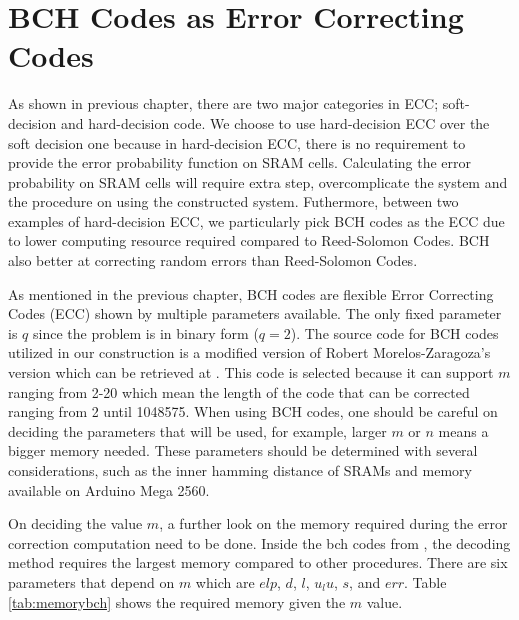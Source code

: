 \section{BCH Codes as Error Correcting Codes}\label{ch:bch}
As shown in previous chapter, there are two major categories in ECC; soft-decision and hard-decision code. We choose to use hard-decision ECC over the soft decision one because in hard-decision ECC, there is no requirement to provide the error probability function on SRAM cells. Calculating the error probability on SRAM cells will require extra step, overcomplicate the system and the procedure on using the constructed system. 
Futhermore, between two examples of hard-decision ECC, we particularly pick BCH codes as the ECC due to lower computing resource required compared to Reed-Solomon Codes. BCH also better at correcting random errors than Reed-Solomon Codes.

As mentioned in the previous chapter, BCH codes are flexible Error Correcting Codes (ECC) shown by multiple parameters available. The only fixed parameter is $q$ since the problem is in binary form ($q=2$). The source code for BCH codes utilized in our construction is a modified version of Robert Morelos-Zaragoza's version which can be retrieved at \cite{bch_code}. This code is selected because it can support $m$ ranging from 2-20 which mean the length of the code that can be corrected ranging from 2 until 1048575. When using BCH codes, one should be careful on deciding the parameters that will be used, for example, larger $m$ or $n$ means a bigger memory needed.
These parameters should be determined with several considerations, such as the inner hamming distance of SRAMs and memory available on Arduino Mega 2560.

On deciding the value $m$, a further look on the memory required during the error correction computation need to be done. Inside the bch codes from \cite{bch_code}, the decoding method requires the largest memory compared to other procedures. There are six parameters that depend on $m$ which are $elp$, $d$, $l$, $u_lu$, $s$, and $err$. Table \ref{tab:memorybch} shows the required memory given the $m$ value.

